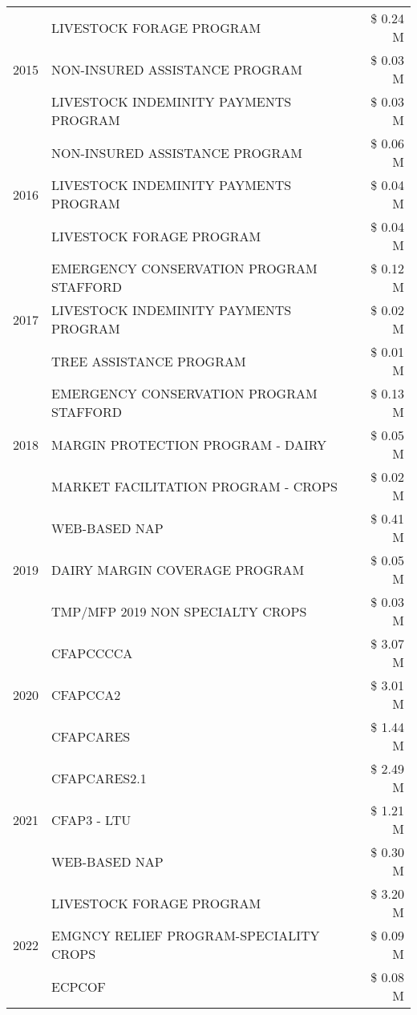 \begin{tabular}{llr}
\cline{1-3}
\multirow[t]{3}{*}{2015} & LIVESTOCK FORAGE PROGRAM & \$ 0.24 M \\
 & NON-INSURED ASSISTANCE PROGRAM & \$ 0.03 M \\
 & LIVESTOCK INDEMINITY PAYMENTS PROGRAM & \$ 0.03 M \\
\cline{1-3}
\multirow[t]{3}{*}{2016} & NON-INSURED ASSISTANCE PROGRAM & \$ 0.06 M \\
 & LIVESTOCK INDEMINITY PAYMENTS PROGRAM & \$ 0.04 M \\
 & LIVESTOCK FORAGE PROGRAM & \$ 0.04 M \\
\cline{1-3}
\multirow[t]{3}{*}{2017} & EMERGENCY CONSERVATION PROGRAM STAFFORD & \$ 0.12 M \\
 & LIVESTOCK INDEMINITY PAYMENTS PROGRAM & \$ 0.02 M \\
 & TREE ASSISTANCE PROGRAM & \$ 0.01 M \\
\cline{1-3}
\multirow[t]{3}{*}{2018} & EMERGENCY CONSERVATION PROGRAM STAFFORD & \$ 0.13 M \\
 & MARGIN PROTECTION PROGRAM - DAIRY & \$ 0.05 M \\
 & MARKET FACILITATION PROGRAM - CROPS & \$ 0.02 M \\
\cline{1-3}
\multirow[t]{3}{*}{2019} & WEB-BASED NAP & \$ 0.41 M \\
 & DAIRY MARGIN COVERAGE PROGRAM & \$ 0.05 M \\
 & TMP/MFP 2019 NON SPECIALTY CROPS & \$ 0.03 M \\
\cline{1-3}
\multirow[t]{3}{*}{2020} & CFAPCCCCA & \$ 3.07 M \\
 & CFAPCCA2 & \$ 3.01 M \\
 & CFAPCARES & \$ 1.44 M \\
\cline{1-3}
\multirow[t]{3}{*}{2021} & CFAPCARES2.1 & \$ 2.49 M \\
 & CFAP3 - LTU & \$ 1.21 M \\
 & WEB-BASED NAP & \$ 0.30 M \\
\cline{1-3}
\multirow[t]{3}{*}{2022} & LIVESTOCK FORAGE PROGRAM & \$ 3.20 M \\
 & EMGNCY RELIEF PROGRAM-SPECIALITY CROPS & \$ 0.09 M \\
 & ECPCOF & \$ 0.08 M \\
\cline{1-3}
\bottomrule
\end{tabular}

